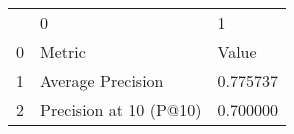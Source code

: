 \begin{tabular}{lll}
 & 0 & 1 \\
0 & Metric & Value \\
1 & Average Precision & 0.775737 \\
2 & Precision at 10 (P@10) & 0.700000 \\
\end{tabular}
